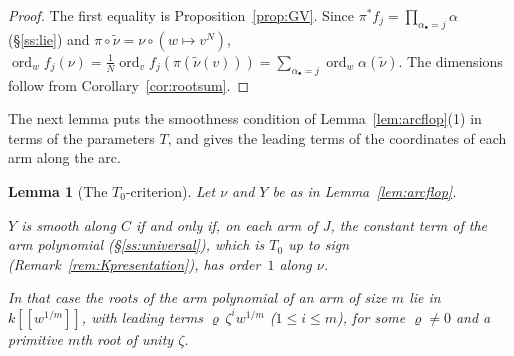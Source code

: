 \documentclass[11pt]{amsart}
\numberwithin{table}{section}
\numberwithin{figure}{section}
\numberwithin{equation}{section}
\newtheorem{lem}[thm]{Lemma}
\theoremstyle{definition}
\theoremstyle{plain}
\newcommand{\bul}{\bullet}
\DeclareMathOperator{\ord}{ord}
\newcommand{\tnu}{\tilde\nu}
\begin{document}
\begin{proof}
The first equality is Proposition~\ref{prop:GV}. Since $\pi^* f_j = \prod_{\alpha_\bul = j} \alpha$ (\S\ref{ss:lie}) and $\pi \circ \tnu = \nu \circ (w \mapsto v^N)$, $\ord_w f_j(\nu) = \frac1N \ord_v f_j(\pi(\tnu(v))) = \sum_{\alpha_\bul = j} \ord_w \alpha(\tnu)$. The dimensions follow from Corollary~\ref{cor:rootsum}.
\end{proof}

The next lemma puts the smoothness condition of Lemma~\ref{lem:arcflop}(1) in terms of the parameters $T$, and gives the leading terms of the coordinates of each arm along the arc.

\begin{lem}[The $T_0$-criterion]\label{lem:flopcrit}
Let $\nu$ and $Y$ be as in Lemma~\ref{lem:arcflop}.
\begin{thmlist}
\item $Y$ is smooth along $C$ if and only if, on each arm of $J$, the constant term of the arm polynomial (\S\ref{ss:universal}), which is $T_0$ up to sign (Remark~\ref{rem:Kpresentation}), has order~$1$ along $\nu$.
\item In that case the roots of the arm polynomial of an arm of size $m$ lie in $k[[w^{1/m}]]$, with leading terms $\varrho\,\zeta^i w^{1/m}$ ($1 \le i \le m$), for some $\varrho \neq 0$ and a primitive $m$th root of unity $\zeta$.
\end{thmlist}
\end{lem}
\end{document}
